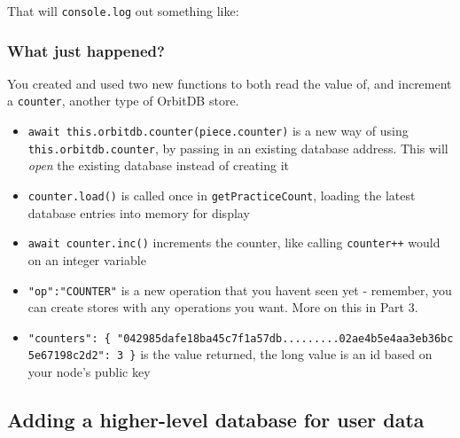 That will \texttt{console.log} out something like:

\begin{Shaded}
\begin{Highlighting}[]
\FunctionTok{\{}
  \FunctionTok{:}\FunctionTok{,}
  \FunctionTok{:}\FunctionTok{,}
  \FunctionTok{:} \FunctionTok{\{}
    \FunctionTok{:}\FunctionTok{,}
    \FunctionTok{:} \FunctionTok{\{}
      \FunctionTok{:}
    \FunctionTok{\}}
  \FunctionTok{\}}
\FunctionTok{\}}
\end{Highlighting}
\end{Shaded}

\subsubsection{What just happened?}\label{what-just-happened-11}

You created and used two new functions to both read the value of, and
increment a \texttt{counter}, another type of OrbitDB store.

\begin{itemize}
\tightlist
\item
  \texttt{await\ this.orbitdb.counter(piece.counter)} is a new way of
  using \texttt{this.orbitdb.counter}, by passing in an existing
  database address. This will \emph{open} the existing database instead
  of creating it
\item
  \texttt{counter.load()} is called once in \texttt{getPracticeCount},
  loading the latest database entries into memory for display
\item
  \texttt{await\ counter.inc()} increments the counter, like calling
  \texttt{counter++} would on an integer variable
\item
  \texttt{"op":"COUNTER"} is a new operation that you havent seen yet -
  remember, you can create stores with any operations you want. More on
  this in Part 3.
\item
  \texttt{"counters":\ \{\ "042985dafe18ba45c7f1a57db.........02ae4b5e4aa3eb36bc5e67198c2d2":\ 3\ \}}
  is the value returned, the long value is an id based on your node's
  public key
\end{itemize}

\subsection{Adding a higher-level database for user
data}\label{adding-a-higher-level-database-for-user-data}

